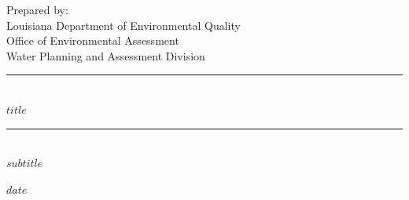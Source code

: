 
\newcommand{\HRule}{\rule{\linewidth}{0.2mm}} %

\newcommand{\LineOne}

\newcommand{\LineTwo}

\newcommand{\LineThree}

\center %
	
	
\textsf{\LARGE Prepared by: }\\[1.0cm] %
	
\textsf{\LARGE Louisiana Department of Environmental Quality}\\[1.0cm] %
	
\textsf{\Large Office of Environmental Assessment}\\[0.25cm] %
	
\textsf{\Large Water Planning and Assessment Division}\\[0.25cm] %
	

	
\HRule\\[0.5cm]
	
\textsf{\huge $title$}\\[0.4cm] %
	
\HRule\\[0.5cm]
	
\textsf{\large $subtitle$}\\[0.25cm] %
	
\vfill %

	
\textsf{\large $date$}\\[0.25cm] %
	
	

